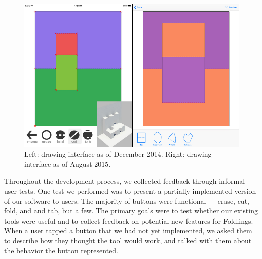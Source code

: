 \begin{figure}[htbp]
\centering
\includegraphics{figures/31_UI_Interface_Iteration/beforeafterinface.pdf}
\caption{Left: drawing interface as of December 2014. Right: drawing
interface as of August 2015.}
\end{figure}

Throughout the development process, we collected feedback through
informal user tests. One test we performed was to present a
partially-implemented version of our software to users. The majority of
buttons were functional --- erase, cut, fold, and and tab, but a few.
The primary goals were to test whether our existing tools were useful
and to collect feedback on potential new features for Foldlings. When a
user tapped a button that we had not yet implemented, we asked them to
describe how they thought the tool would work, and talked with them
about the behavior the button represented.


